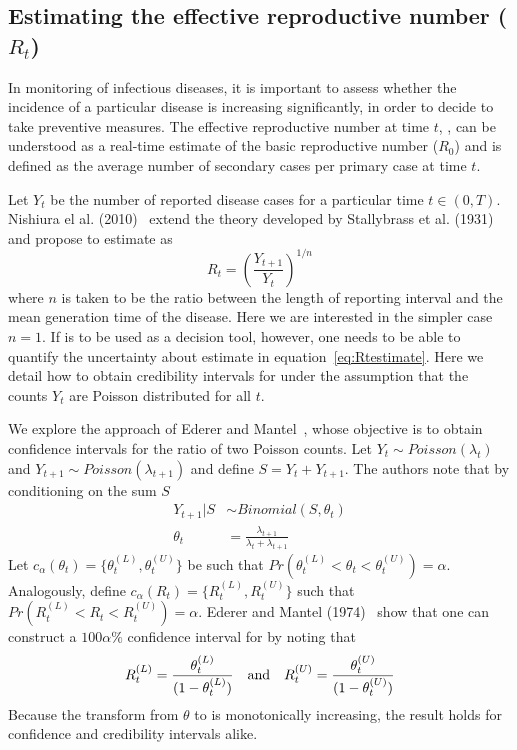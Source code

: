 \subsection*{Estimating the effective reproductive number ($R_t$)}

In monitoring of infectious diseases, it is important to assess whether the 
incidence of a  particular disease is increasing significantly, in order to 
decide to take preventive measures.
The effective reproductive number at time $t$, \rr, can be understood as a 
real-time estimate of the basic reproductive number ($R_{0}$) and is defined as 
the average number of secondary cases per primary case at time $t$.

Let $Y_t$ be the number of reported disease cases for a particular time $t \in 
(0, T)$.
Nishiura el al. (2010)~\cite{nishiura} extend the theory developed by 
Stallybrass et al. (1931)~\cite{stallybrass} and propose to estimate \rr as
\begin{equation}
\label{eq:Rtestimate}
R_t = \left( \frac{Y_{t+1}}{Y_t}\right)^{1/n}
\end{equation}
where $n$ is taken to be the ratio between the length of reporting interval and 
the mean generation time of the disease.
Here we are interested in the simpler case $n=1$.
If \rr is to be used as a decision tool, however, one needs to be able to 
quantify the 
uncertainty about estimate in equation~\ref{eq:Rtestimate}. 
Here we detail how to obtain credibility intervals for \rr under the assumption 
that the counts $Y_t$ are Poisson distributed for all $t$.

We explore the approach of Ederer and Mantel~\cite{mantel}, whose objective is 
to obtain 
confidence intervals for the ratio of two Poisson counts. 
Let $Y_{t} \sim Poisson(\lambda_t)$ and $Y_{t+1} \sim Poisson(\lambda_{t+1})$ 
and define $S = Y_{t} + Y_{t+1}$.
The authors note that by conditioning on the sum $S$
\begin{align}
\label{eq:binlike}
Y_{t+1} | S &\sim Binomial(S, \theta_t) \\
\theta_t &= \frac{\lambda_{t+1}}{\lambda_{t} + \lambda_{t+1}}
\end{align}
Let $c_{\alpha}(\theta_t) = \{\theta_t^{(L)} , \theta_t^{(U)} \}$ be such that 
$Pr(\theta_t^{(L)}<\theta_t <\theta_t^{(U)}) = \alpha$.
Analogously, define $c_{\alpha}(R_t) = \{R_t^{(L)} , R_t^{(U)} \}$ such that 
$Pr(R_t^{(L)}<R_t<R_t^{(U)}) = \alpha$.
Ederer and Mantel (1974)~\cite{mantel} show that one can construct a $100\alpha 
\%$ confidence interval for \rr by noting that
\begin{equation}
\label{eq:confRt}
 R_t^{(L)} = \frac{\theta_t^{(L)}}{(1-\theta_t^{(L)})} \quad \text{and} \quad R_t^{(U)} = \frac{\theta_t^{(U)}}{(1-\theta_t^{(U)})}\nonumber \\
\end{equation}
Because the transform from $\theta$ to \rr is monotonically 
increasing, the result holds for confidence and credibility intervals alike.

